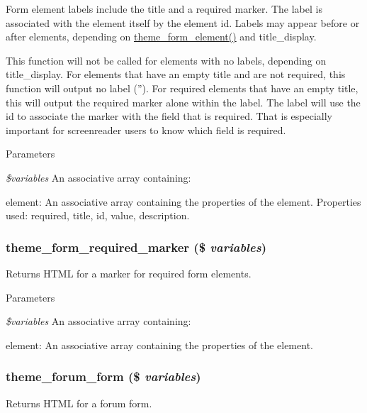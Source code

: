 Form element labels include the title and a required marker. The label is associated with the element itself by the element id. Labels may appear before or after elements, depending on \hyperlink{group__themeable_gafa399c53da3c042edf3863f222d036aa}{theme\_\-form\_\-element()} and title\_\-display.

This function will not be called for elements with no labels, depending on title\_\-display. For elements that have an empty title and are not required, this function will output no label (''). For required elements that have an empty title, this will output the required marker alone within the label. The label will use the id to associate the marker with the field that is required. That is especially important for screenreader users to know which field is required.


\begin{DoxyParams}{Parameters}
\item[{\em \$variables}]An associative array containing:
\begin{DoxyItemize}
\item element: An associative array containing the properties of the element. Properties used: required, title, id, value, description. 
\end{DoxyItemize}\end{DoxyParams}
\hypertarget{group__themeable_gaa83136018b3c3b40bacae97fe3abcb17}{
\subsubsection[{theme\_\-form\_\-required\_\-marker}]{\setlength{\rightskip}{0pt plus 5cm}theme\_\-form\_\-required\_\-marker (\$ {\em variables})}}
\label{group__themeable_gaa83136018b3c3b40bacae97fe3abcb17}
Returns HTML for a marker for required form elements.


\begin{DoxyParams}{Parameters}
\item[{\em \$variables}]An associative array containing:
\begin{DoxyItemize}
\item element: An associative array containing the properties of the element. 
\end{DoxyItemize}\end{DoxyParams}
\hypertarget{group__themeable_ga32e5ebb6f4e42f0e96175e6c11fb66d1}{
\subsubsection[{theme\_\-forum\_\-form}]{\setlength{\rightskip}{0pt plus 5cm}theme\_\-forum\_\-form (\$ {\em variables})}}
\label{group__themeable_ga32e5ebb6f4e42f0e96175e6c11fb66d1}
Returns HTML for a forum form.

